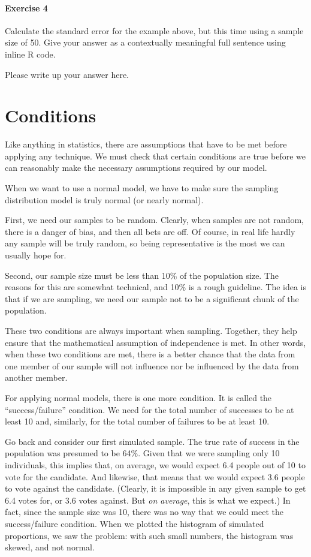 \documentclass[
]{book}
\begin{document}
\hypertarget{exercise-4-8}{%
\paragraph*{Exercise 4}\label{exercise-4-8}}

Calculate the standard error for the example above, but this time using a sample size of 50. Give your answer as a contextually meaningful full sentence using inline R code.

Please write up your answer here.

\hypertarget{samp-dist-models-conditions}{%
\section{Conditions}\label{samp-dist-models-conditions}}

Like anything in statistics, there are assumptions that have to be met before applying any technique. We must check that certain conditions are true before we can reasonably make the necessary assumptions required by our model.

When we want to use a normal model, we have to make sure the sampling distribution model is truly normal (or nearly normal).

First, we need our samples to be random. Clearly, when samples are not random, there is a danger of bias, and then all bets are off. Of course, in real life hardly any sample will be truly random, so being representative is the most we can usually hope for.

Second, our sample size must be less than 10\% of the population size. The reasons for this are somewhat technical, and 10\% is a rough guideline. The idea is that if we are sampling, we need our sample not to be a significant chunk of the population.

These two conditions are always important when sampling. Together, they help ensure that the mathematical assumption of independence is met. In other words, when these two conditions are met, there is a better chance that the data from one member of our sample will not influence nor be influenced by the data from another member.

For applying normal models, there is one more condition. It is called the ``success/failure'' condition. We need for the total number of successes to be at least 10 and, similarly, for the total number of failures to be at least 10.

Go back and consider our first simulated sample. The true rate of success in the population was presumed to be 64\%. Given that we were sampling only 10 individuals, this implies that, on average, we would expect 6.4 people out of 10 to vote for the candidate. And likewise, that means that we would expect 3.6 people to vote against the candidate. (Clearly, it is impossible in any given sample to get 6.4 votes for, or 3.6 votes against. But \emph{on average}, this is what we expect.) In fact, since the sample size was 10, there was no way that we could meet the success/failure condition. When we plotted the histogram of simulated proportions, we saw the problem: with such small numbers, the histogram was skewed, and not normal.
\end{document}
